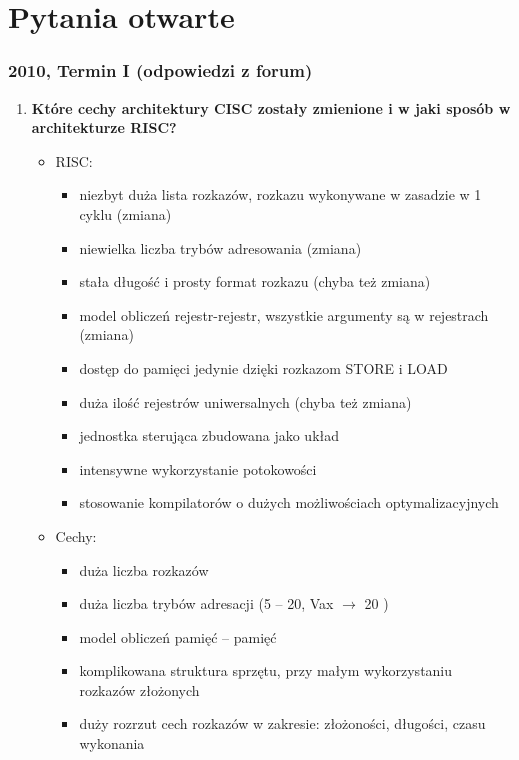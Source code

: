
\newpage
\part{Pytania otwarte}
	\section{2010, Termin I (odpowiedzi z forum)}
		\begin{enumerate}
			\item \textbf{Które cechy architektury CISC zostały zmienione i w jaki sposób w architekturze RISC?}
			\begin{itemize}
				\item RISC:
				\begin{itemize}
					\item niezbyt duża lista rozkazów, rozkazu wykonywane w zasadzie w 1 cyklu (zmiana)
					\item  niewielka liczba trybów adresowania (zmiana)
					\item stała długość i prosty format rozkazu (chyba też zmiana)
					\item model obliczeń rejestr-rejestr, wszystkie argumenty są w rejestrach (zmiana) 
					\item dostęp do pamięci jedynie dzięki rozkazom STORE i LOAD
					\item duża ilość rejestrów uniwersalnych (chyba też zmiana)
					\item jednostka sterująca zbudowana jako układ
					\item intensywne wykorzystanie potokowości
					\item stosowanie kompilatorów o dużych możliwościach optymalizacyjnych
				\end{itemize}
				\item Cechy:
				\begin{itemize}
					\item duża liczba rozkazów
					\item duża liczba trybów adresacji (5 – 20, Vax $ \rightarrow $ 20 )
					\item model obliczeń pamięć – pamięć
					\item komplikowana struktura sprzętu, przy małym wykorzystaniu rozkazów złożonych
					\item duży rozrzut cech rozkazów w zakresie: złożoności, długości, czasu wykonania
				\end{itemize}
			\end{itemize}
			\label{itm:risc}
			

\end{enumerate}
